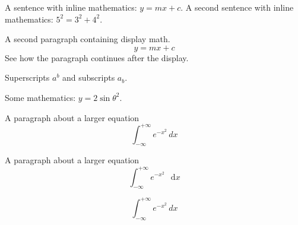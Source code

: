 \documentclass{article}
\newcommand{\diff}{\mathop{}\!\mathrm{d}} %
\begin{document}
A sentence with inline mathematics: $y = mx + c$.
A second sentence with inline mathematics: $5^{2}=3^{2}+4^{2}$.

A second paragraph containing display math.
\[
	y = mx + c
\]
See how the paragraph continues after the display.

Superscripts $a^{b}$ and subscripts $a_{b}$.

Some mathematics: $y = 2 \sin \theta^{2}$.

A paragraph about a larger equation
\[
\int_{-\infty}^{+\infty} e^{-x^2} \, dx %
\]

A paragraph about a larger equation
\[
\int_{-\infty}^{+\infty} e^{-x^2} \, \diff x %
\]

\begin{equation}
\int_{-\infty}^{+\infty} e^{-x^2} \, dx
\end{equation}



\end{document}
